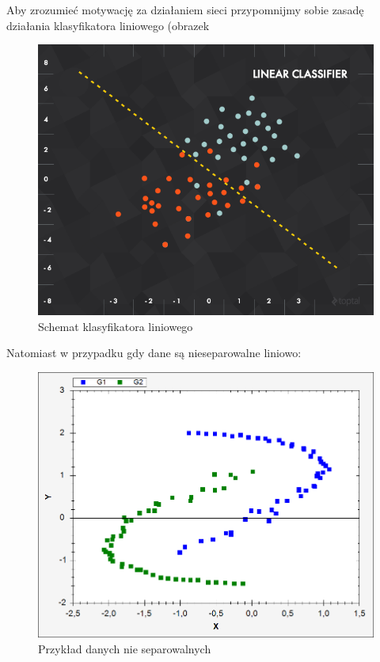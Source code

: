 \documentclass[10pt,a4paper]{book}
\begin{document}
Aby zrozumieć motywację za działaniem sieci przypomnijmy sobie zasadę działania klasyfikatora liniowego (obrazek 
\begin{figure}
\centering
\includegraphics[scale=0.3]{images/klasyfikator_liniowy.png}
\caption{Schemat klasyfikatora liniowego}
\label{fig.chapter.predictions.linear.ann}
\end{figure}

Natomiast w przypadku gdy dane są nieseparowalne liniowo:
\begin{figure}
\centering
\includegraphics[scale=0.3]{images/nieseparowalne_dane.png}
\caption{Przykład danych nie separowalnych}
\label{fig.chapter.predictions.linear.ann.not.separable}
\end{figure}
\end{document}
